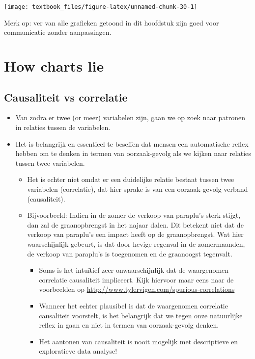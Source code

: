 \documentclass[]{tufte-book}
\providecommand{\tightlist}{%
  \setlength{\itemsep}{0pt}\setlength{\parskip}{0pt}}
\begin{document}
\texttt{[image: textbook\_files/figure-latex/unnamed-chunk-30-1]}

Merk op: ver van alle grafieken getoond in dit hoofdstuk zijn goed voor communicatie zonder aanpassingen.

\hypertarget{how-charts-lie}{%
\section{How charts lie}\label{how-charts-lie}}

\hypertarget{causaliteit-vs-correlatie}{%
\subsection{Causaliteit vs correlatie}\label{causaliteit-vs-correlatie}}

\begin{itemize}
\tightlist
\item
  Van zodra er twee (or meer) variabelen zijn, gaan we op zoek naar patronen in relaties tussen de variabelen.
\item
  Het is belangrijk en essentieel te beseffen dat mensen een automatische reflex hebben om te denken in termen van oorzaak-gevolg als we kijken naar relaties tussen twee variabelen.

  \begin{itemize}
  \tightlist
  \item
    Het is echter niet omdat er een duidelijke relatie bestaat tussen twee variabelen (correlatie), dat hier sprake is van een oorzaak-gevolg verband (causaliteit).
  \item
    Bijvoorbeeld: Indien in de zomer de verkoop van paraplu's sterk stijgt, dan zal de graanopbrengst in het najaar dalen. Dit betekent niet dat de verkoop van paraplu's een impact heeft op de graanopbrengst. Wat hier waarschijnlijk gebeurt, is dat door hevige regenval in de zomermaanden, de verkoop van paraplu's is toegenomen en de graanoogst tegenvalt.

    \begin{itemize}
    \tightlist
    \item
      Soms is het intuïtief zeer onwaarschijnlijk dat de waargenomen correlatie causaliteit impliceert. Kijk hiervoor maar eens naar de voorbeelden op \url{http://www.tylervigen.com/spurious-correlations}
    \item
      Wanneer het echter plausibel is dat de waargenomen correlatie causaliteit voorstelt, is het belangrijk dat we tegen onze natuurlijke reflex in gaan en niet in termen van oorzaak-gevolg denken.
    \item
      Het aantonen van causaliteit is nooit mogelijk met descriptieve en exploratieve data analyse!
    \end{itemize}
  \end{itemize}
\end{itemize}
\end{document}
